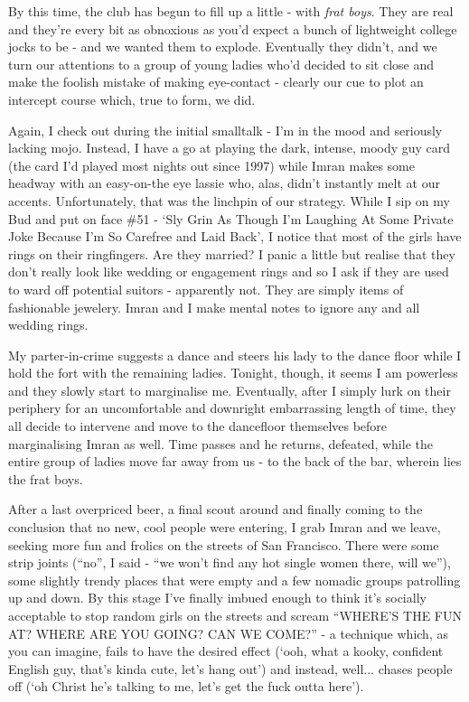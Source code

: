 \documentclass[a5paper,titlepage,11pt]{book}
\begin{document}
By this time, the club has begun to fill up a little - with \emph{frat boys}.  They are real and they're every bit as obnoxious as you'd expect a bunch of lightweight college jocks to be - and we wanted them to explode.  Eventually they didn't, and we turn our attentions to a group of young ladies who'd decided to sit close and make the foolish mistake of making eye-contact - clearly our cue to plot an intercept course which, true to form, we did.

Again, I check out during the initial smalltalk - I'm in the mood and seriously lacking mojo.  Instead, I have a go at playing the dark, intense, moody guy card (the card I'd played most nights out since 1997) while Imran makes some headway with an easy-on-the eye lassie who, alas, didn't instantly melt at our accents.  Unfortunately, that was the linchpin of our strategy.  While I sip on my Bud and put on face \#51 - `Sly Grin As Though I'm Laughing At Some Private Joke Because I'm So Carefree and Laid Back', I notice that most of the girls have rings on their ringfingers.  Are they married?  I panic a little but realise that they don't really look like wedding or engagement rings and so I ask if they are used to ward off potential suitors - apparently not.  They are simply items of fashionable jewelery.  Imran and I make mental notes to ignore any and all wedding rings.

My parter-in-crime suggests a dance and steers his lady to the dance floor while I hold the fort with the remaining ladies.  Tonight, though, it seems I am powerless and they slowly start to marginalise me.  Eventually, after I simply lurk on their periphery for an uncomfortable and downright embarrassing length of time, they all decide to intervene and move to the dancefloor themselves before marginalising Imran as well.  Time passes and he returns, defeated, while the entire group of ladies move far away from us - to the back of the bar, wherein lies the frat boys.

After a last overpriced beer, a final scout around and finally coming to the conclusion that no new, cool people were entering, I grab Imran and we leave, seeking more fun and frolics on the streets of San Francisco.  There were some strip joints (``no'', I said - ``we won't find any hot single women there, will we''), some slightly trendy places that were empty and a few nomadic groups patrolling up and down.  By this stage I've finally imbued enough to think it's socially acceptable to stop random girls on the streets and scream ``WHERE'S THE FUN AT?  WHERE ARE YOU GOING?  CAN WE COME?'' - a technique which, as you can imagine, fails to have the desired effect (`ooh, what a kooky, confident English guy, that's kinda cute, let's hang out') and instead, well... chases people off (`oh Christ he's talking to me, let's get the fuck outta here').
\end{document}
